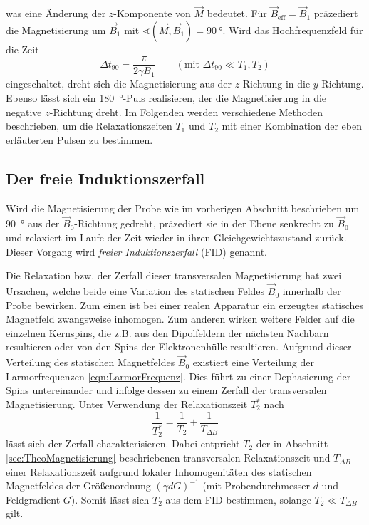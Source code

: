 was eine Änderung der $z$-Komponente von $\vec{M}$ bedeutet.
Für $\vec{B}_\text{eff} = \vec{B}_1$ präzediert die Magnetisierung um $\vec{B}_1$
mit $\sphericalangle\!\left(\vec{M}, \vec{B}_1\right) = \SI{90}{\degree}$.
Wird das Hochfrequenzfeld für die Zeit
\begin{equation}
  \Delta t_{90} = \frac{\pi}{2 \gamma B_1}
  \quad\quad (\text{mit } \Delta t_{90} \ll T_1, T_2)
  \label{eqn:t90}
\end{equation}
eingeschaltet, dreht sich die Magnetisierung aus der $z$-Richtung in die
$y$-Richtung.
Ebenso lässt sich ein \SI{180}{\degree}-Puls realisieren, der die Magnetisierung
in die negative $z$-Richtung dreht.
Im Folgenden werden verschiedene Methoden beschrieben, um die Relaxationszeiten
$T_1$ und $T_2$ mit einer Kombination der eben erläuterten Pulsen zu bestimmen.


\subsection{Der freie Induktionszerfall}
\label{sec:FID}

Wird die Magnetisierung der Probe wie im vorherigen Abschnitt beschrieben um \SI{90}{\degree}
aus der $\vec{B}_0$-Richtung gedreht, präzediert sie in der Ebene senkrecht zu
$\vec{B}_0$ und relaxiert im Laufe der Zeit wieder in ihren Gleichgewichtszustand
zurück. Dieser Vorgang wird \emph{freier Induktionszerfall} (FID) genannt.

Die Relaxation bzw. der Zerfall dieser transversalen Magnetisierung hat zwei Ursachen,
welche beide eine Variation des statischen Feldes $\vec{B}_0$ innerhalb der
Probe bewirken.
Zum einen ist bei einer realen Apparatur ein erzeugtes statisches Magnetfeld
zwangsweise inhomogen.
Zum anderen wirken weitere Felder auf die einzelnen Kernspins,
die z.B. aus den Dipolfeldern der nächsten Nachbarn resultieren oder von den
Spins der Elektronenhülle resultieren.
Aufgrund dieser Verteilung des statischen Magnetfeldes $\vec{B}_0$ existiert eine
Verteilung der Larmorfrequenzen \eqref{eqn:LarmorFrequenz}.
Dies führt zu einer Dephasierung der Spins untereinander und infolge dessen
zu einem Zerfall der transversalen Magnetisierung.
Unter Verwendung der Relaxationszeit $T_2^*$ nach
\begin{equation*}
  \frac{1}{T_2^*} = \frac{1}{T_2} + \frac{1}{T_{\Delta B}}
\end{equation*}
lässt sich der Zerfall charakterisieren.
Dabei entpricht $T_2$ der in Abschnitt \ref{sec:TheoMagnetisierung} beschriebenen
transversalen Relaxationszeit und $T_{\Delta B}$ einer Relaxationszeit aufgrund
lokaler Inhomogenitäten des statischen Magnetfeldes der Größenordnung
$\left(\gamma d G\right)^{-1}$
(mit Probendurchmesser $d$ und Feldgradient $G$).
Somit lässt sich $T_2$ aus dem FID bestimmen, solange $T_2 \ll T_{\Delta B}$
gilt.


